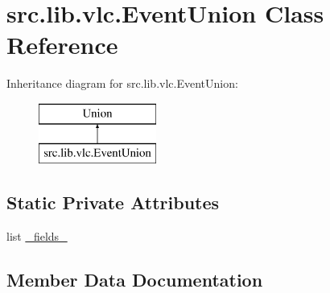 \hypertarget{classsrc_1_1lib_1_1vlc_1_1EventUnion}{}\section{src.\+lib.\+vlc.\+Event\+Union Class Reference}
\label{classsrc_1_1lib_1_1vlc_1_1EventUnion}
Inheritance diagram for src.\+lib.\+vlc.\+Event\+Union\+:\begin{figure}[H]
\begin{center}
\leavevmode
\includegraphics[height=2.000000cm]{classsrc_1_1lib_1_1vlc_1_1EventUnion}
\end{center}
\end{figure}
\subsection*{Static Private Attributes}
\begin{DoxyCompactItemize}
\item 
list \hyperlink{classsrc_1_1lib_1_1vlc_1_1EventUnion_aadde1d5693ac89f6f6e3169a33481ef6}{\+\_\+fields\+\_\+}
\end{DoxyCompactItemize}


\subsection{Member Data Documentation}
\hypertarget{classsrc_1_1lib_1_1vlc_1_1EventUnion_aadde1d5693ac89f6f6e3169a33481ef6}{}
